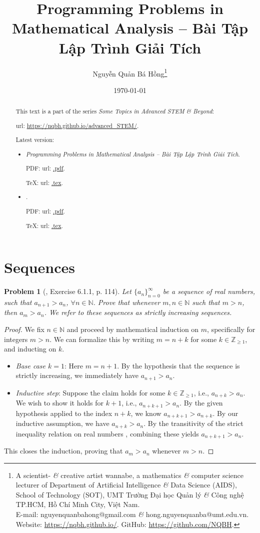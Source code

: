 \documentclass{article}
\title{Programming Problems in Mathematical Analysis -- Bài Tập Lập Trình Giải Tích}
\author{Nguyễn Quản Bá Hồng\footnote{A scientist- {\it\&} creative artist wannabe, a mathematics {\it\&} computer science lecturer of Department of Artificial Intelligence {\it\&} Data Science (AIDS), School of Technology (SOT), UMT Trường Đại học Quản lý {\it\&} Công nghệ TP.HCM, Hồ Chí Minh City, Việt Nam.\\E-mail: {\sf nguyenquanbahong@gmail.com} {\it\&} {\sf hong.nguyenquanba@umt.edu.vn}. Website: \url{https://nqbh.github.io/}. GitHub: \url{https://github.com/NQBH}.}}
\date{\today}
\newtheorem{problem}{Problem}
\begin{document}
\maketitle
\begin{abstract}
	This text is a part of the series {\it Some Topics in Advanced STEM \& Beyond}:
	
	{\sc url}: \url{https://nqbh.github.io/advanced_STEM/}.
	
	Latest version:
	\begin{itemize}
		\item {\it Programming Problems in Mathematical Analysis -- Bài Tập Lập Trình Giải Tích}.
		
		PDF: {\sc url}: \url{.pdf}.
		
		\TeX: {\sc url}: \url{.tex}.
		\item {\it }.
		
		PDF: {\sc url}: \url{.pdf}.
		
		\TeX: {\sc url}: \url{.tex}.
	\end{itemize}
\end{abstract}
\tableofcontents


\section{Sequences}

\begin{problem}[\cite{Tao_analysis_1}, Exercise 6.1.1, p. 114]
	Let $\{a_n\}_{n=0}^\infty$ be a sequence of real numbers, such that $a_{n+1} > a_n$, $\forall n\in\mathbb{N}$. Prove that whenever $m,n\in\mathbb{N}$ such that $m > n$, then $a_m > a_n$. We refer to these sequences as \emph{strictly increasing} sequences.
\end{problem}

\begin{proof}[Proof]
	We fix $n\in\mathbb{N}$ and proceed by mathematical induction on $m$, specifically for integers $m > n$. We can formalize this by writing $m = n + k$ for some $k\in\mathbb{Z}_{\ge1}$, and inducting on $k$.
	\begin{itemize}
		\item \emph{Base case $k = 1$}: Here $m = n + 1$. By the hypothesis that the sequence is strictly increasing, we immediately have $a_{n+1} > a_n$.
		\item \emph{Inductive step}: Suppose the claim holds for some $k\in\mathbb{Z}_{\ge1}$, i.e., $a_{n + k} > a_n$. We wish to show it holds for $k + 1$, i.e., $a_{n + k + 1} > a_n$. By the given hypothesis applied to the index $n + k$, we know $a_{n + k + 1} > a_{n + k}$. By our inductive assumption, we have $a_{n + k} > a_n$. By the transitivity of the strict inequality relation on real numbers \cite[Prop. 5.4.7]{Tao_analysis_1}, combining these yields $a_{n + k + 1} > a_n$.
	\end{itemize}	
	This closes the induction, proving that $a_m > a_n$ whenever $m > n$.
\end{proof}
\end{document}
